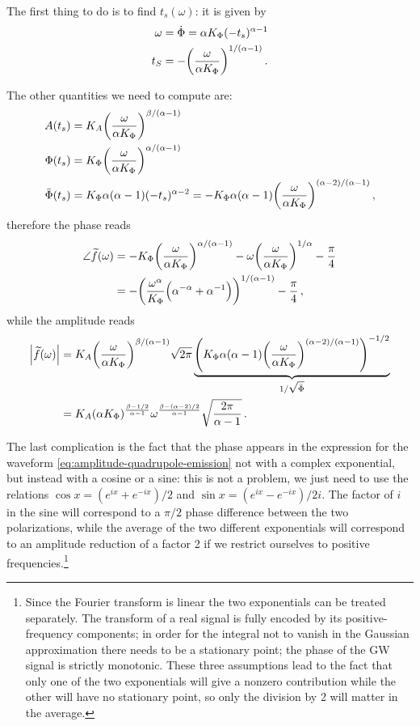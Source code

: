 \documentclass[main.tex]{subfiles}
\begin{document}
The first thing to do is to find \(t_s(\omega )\): it is given by 
%
\begin{align}
\omega &= \dot{\Phi} = \alpha K_\Phi (-t_s)^{\alpha -1}   \\
t_S &= - \qty( \frac{\omega }{\alpha  K_\Phi })^{1/(\alpha -1)}
\,.
\end{align}

The other quantities we need to compute are: 
%
\begin{align}
A(t_s) &= K_A \qty(\frac{\omega  }{\alpha  K_\Phi })^{\beta / (\alpha-1 )}  \\
\Phi(t_s) &= K_\Phi \qty(\frac{\omega }{\alpha  K_\Phi })^{\alpha / (\alpha-1 )}  \\ 
\ddot{\Phi}(t_s) &= K_\Phi \alpha (\alpha -1) (-t_s)^{\alpha - 2} 
= - K_\Phi \alpha (\alpha -1) \qty(\frac{\omega }{\alpha  K_\Phi })^{(\alpha -2) / ( \alpha -1)}  
\,,
\end{align}
%
therefore the phase reads 
%
\begin{align}
\angle \widetilde{f}(\omega ) &= - K_\Phi \qty(\frac{\omega }{\alpha  K_\Phi })^{\alpha / (\alpha-1 )} 
- \omega \qty(\frac{\omega }{\alpha  K_\Phi })^{1/\alpha } - \frac{\pi}{4}  \\
&= - \qty(\frac{\omega^{\alpha }}{K_\Phi } \qty(\alpha^{-\alpha } + \alpha^{-1}))^{1 / (\alpha - 1)}  - \frac{\pi}{4}
\,,
\end{align}
%
while the amplitude reads 
%
\begin{align}
\abs{\widetilde{f}(\omega )} &= K_A \qty(\frac{\omega }{\alpha K_\Phi })^{\beta / (\alpha-1 )} \sqrt{2 \pi } \underbrace{\qty(K_\Phi \alpha (\alpha -1) \qty(\frac{\omega }{\alpha  K_\Phi })^{(\alpha -2) / ( \alpha -1)})^{-1/2}}_{1 / \sqrt{\ddot{\Phi}}}   \\
&= K_A 
(\alpha K_\Phi)^{\frac{\beta - 1/2}{\alpha -1}}
\omega^{\frac{\beta - (\alpha - 2) / 2}{\alpha -1}}
\sqrt{ \frac{2\pi}{\alpha -1} }
\,.
\end{align}

The last complication is the fact that the phase appears in the expression for the waveform \eqref{eq:amplitude-quadrupole-emission} not with a complex exponential, but instead with a cosine or a sine: this is not a problem, we just need to use the relations \(\cos x = (e^{ix}+e^{-ix}) / 2\) and \(\sin x = (e^{ix}- e^{-ix}) / 2i\). 
The factor of \(i\) in the sine will correspond to a \(\pi /2\) phase difference between the two polarizations, while the average of the two different exponentials will correspond to an amplitude reduction of a factor 2 if we restrict ourselves to positive frequencies.\footnote{Since the Fourier transform is linear the two exponentials can be treated separately. The transform of a real signal is fully encoded by its positive-frequency components; in order for the integral not to vanish in the Gaussian approximation there needs to be a stationary point; the phase of the \ac{GW} signal is strictly monotonic. These three assumptions lead to the fact that only one of the two exponentials will give a nonzero contribution while the other will have no stationary point, so only the division by 2 will matter in the average.}
\end{document}
